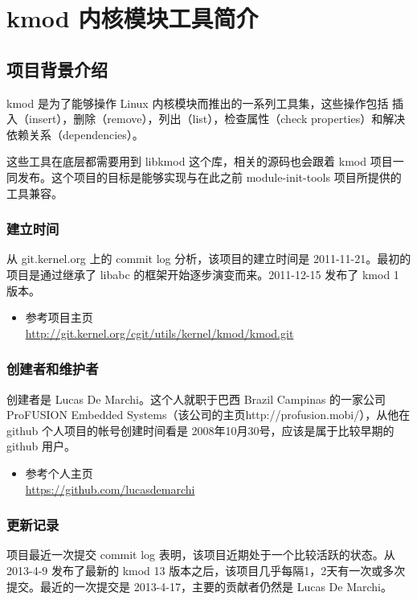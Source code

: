 \chapter{kmod 内核模块工具简介}

\section{项目背景介绍}

kmod 是为了能够操作 Linux 内核模块而推出的一系列工具集，这些操作包括
插入（insert），删除（remove），列出（list），检查属性（check
properties）和解决依赖关系（dependencies）。

这些工具在底层都需要用到 libkmod 这个库，相关的源码也会跟着 kmod
项目一同发布。这个项目的目标是能够实现与在此之前 module-init-tools
项目所提供的工具兼容。

\subsection{建立时间}

从 git.kernel.org 上的 commit log 分析，该项目的建立时间是
2011-11-21。最初的项目是通过继承了 libabc
的框架开始逐步演变而来。2011-12-15 发布了 kmod 1 版本。

\begin{itemize}
\item
  参考项目主页\\
  \url{http://git.kernel.org/cgit/utils/kernel/kmod/kmod.git}
\end{itemize}
\subsection{创建者和维护者}

创建者是 Lucas De Marchi。这个人就职于巴西 Brazil Campinas
的一家公司ProFUSION Embedded
Systems（该公司的主页http://profusion.mobi/），从他在 github
个人项目的帐号创建时间看是 2008年10月30号，应该是属于比较早期的 github
用户。

\begin{itemize}
\item
  参考个人主页\\ \url{https://github.com/lucasdemarchi}
\end{itemize}
\subsection{更新记录}

项目最近一次提交 commit log 表明，该项目近期处于一个比较活跃的状态。从
2013-4-9 发布了最新的 kmod 13
版本之后，该项目几乎每隔1，2天有一次或多次提交。最近的一次提交是
2013-4-17，主要的贡献者仍然是 Lucas De Marchi。

